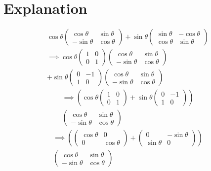 \documentclass[journal,12pt,twocolumn]{IEEEtran}
\begin{document}
\section{\textbf{Explanation}}
\begin{gather}
    \cos\theta\left(\begin{array}{cc}\cos\theta & \sin\theta \\ -\sin\theta & \cos\theta\end{array}\right)+\sin\theta\left(\begin{array}{cc}\sin\theta & -\cos\theta \\ \cos\theta & \sin\theta\end{array}\right)\\
    \implies\cos\theta\left(\begin{array}{cc} 1 & 0 \\ 0 & 1\end{array}\right)\left(\begin{array}{cc}\cos\theta & \sin\theta \\ -\sin\theta & \cos\theta\end{array}\right)\\\nonumber+\sin\theta\left(\begin{array}{cc} 0 & -1 \\ 1 & 0 \end{array}\right)\left(\begin{array}{cc}\cos\theta & \sin\theta \\ -\sin\theta & \cos\theta\end{array}\right)
\end{gather}
\begin{multline}
    \implies\left(\cos\theta\left(\begin{array}{cc} 1 & 0 \\ 0 & 1\end{array}\right)+\sin\theta\left(\begin{array}{cc} 0 & -1 \\ 1 & 0 \end{array}\right)\right)\\\left(\begin{array}{cc}\cos\theta & \sin\theta \\ -\sin\theta & \cos\theta\end{array}\right)
\end{multline}
\begin{multline}
    \implies\left(\left(\begin{array}{cc} \cos\theta & 0 \\ 0 & \cos\theta\end{array}\right)+\left(\begin{array}{cc} 0 & -\sin\theta \\ \sin\theta & 0 \end{array}\right)\right)\\\left(\begin{array}{cc}\cos\theta & \sin\theta \\ -\sin\theta & \cos\theta\end{array}\right)
\end{multline}
\end{document}
